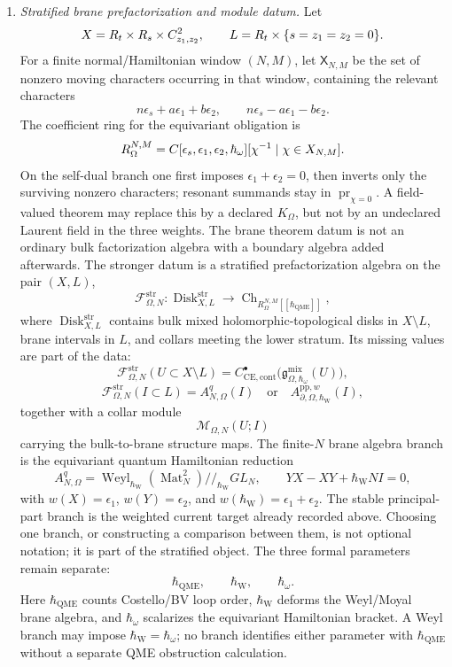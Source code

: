 \begin{enumerate}
  \item \emph{Stratified brane prefactorization and module datum.}
  Let
  \[
    X=R_t\times R_s\times C^2_{z_1,z_2},\qquad
    L=R_t\times\{s=z_1=z_2=0\}.
  \]
  For a finite normal/Hamiltonian window \((N,M)\), let
  \(\mathsf X_{N,M}\) be the set of nonzero moving characters occurring
  in that window, containing the relevant characters
  \[
    n\epsilon_s+a\epsilon_1+b\epsilon_2,\qquad
    n\epsilon_s-a\epsilon_1-b\epsilon_2 .
  \]
  The coefficient ring for the equivariant obligation is
  \[
    R_\Omega^{N,M}
    =
    C[\epsilon_s,\epsilon_1,\epsilon_2,\hbar_\omega]
    [\chi^{-1}\mid \chi\in X_{N,M}].
  \]
  On the self-dual branch one first imposes
  \(\epsilon_1+\epsilon_2=0\), then inverts only the surviving nonzero
  characters; resonant summands stay in \(\operatorname{pr}_{\chi=0}\).
  A field-valued theorem may replace this by a declared \(K_\Omega\), but
  not by an undeclared Laurent field in the three weights.
  The brane theorem datum is not an ordinary bulk factorization algebra
  with a boundary algebra added afterwards.  The stronger datum is a
  stratified prefactorization algebra on the pair \((X,L)\),
  \[
    \mathcal F^{\mathrm{str}}_{\Omega,N}\colon
    \operatorname{Disk}^{\mathrm{str}}_{X,L}
      \longrightarrow
    \operatorname{Ch}_{R_\Omega^{N,M}[[\hbar_{\mathrm{QME}}]]},
  \]
  where \(\operatorname{Disk}^{\mathrm{str}}_{X,L}\) contains bulk
  mixed holomorphic-topological disks in \(X\setminus L\), brane intervals
  in \(L\), and collars meeting the lower stratum.  Its missing values
  are part of the data:
  \[
    \mathcal F^{\mathrm{str}}_{\Omega,N}(U\subset X\setminus L)
    =
    C^\bullet_{\mathrm{CE},\mathrm{cont}}
    \bigl(\mathfrak g^{\mathrm{mix}}_{\Omega,\hbar_\omega}(U)\bigr),
  \]
  \[
    \mathcal F^{\mathrm{str}}_{\Omega,N}(I\subset L)
    =
    A^q_{N,\Omega}(I)
    \quad\text{or}\quad
    A^{\mathrm{pp},w}_{\partial,\Omega,\hbar_{\mathrm{W}}}(I),
  \]
  together with a collar module
  \[
    \mathcal M_{\Omega,N}(U;I)
  \]
  carrying the bulk-to-brane structure maps.  The finite-\(N\) brane
  algebra branch is the equivariant quantum Hamiltonian reduction
  \[
    A^q_{N,\Omega}
    =
    \operatorname{Weyl}_{\hbar_{\mathrm{W}}}(\operatorname{Mat}_N^2)
    //_{\hbar_{\mathrm{W}}} GL_N,
    \qquad
    YX-XY+\hbar_{\mathrm{W}}N I=0,
  \]
  with \(w(X)=\epsilon_1\), \(w(Y)=\epsilon_2\), and
  \(w(\hbar_{\mathrm{W}})=\epsilon_1+\epsilon_2\).  The stable
  principal-part branch is the weighted current target already recorded
  above.  Choosing one branch, or constructing a comparison between them,
  is not optional notation; it is part of the stratified object.
  The three formal parameters remain separate:
  \[
    \hbar_{\mathrm{QME}},\qquad
    \hbar_{\mathrm{W}},\qquad
    \hbar_\omega .
  \]
  Here \(\hbar_{\mathrm{QME}}\) counts Costello/BV loop order,
  \(\hbar_{\mathrm{W}}\) deforms the Weyl/Moyal brane algebra, and
  \(\hbar_\omega\) scalarizes the equivariant Hamiltonian bracket.  A
  Weyl branch may impose \(\hbar_{\mathrm{W}}=\hbar_\omega\); no branch
  identifies either parameter with \(\hbar_{\mathrm{QME}}\) without a
  separate QME obstruction calculation.


\end{enumerate}

